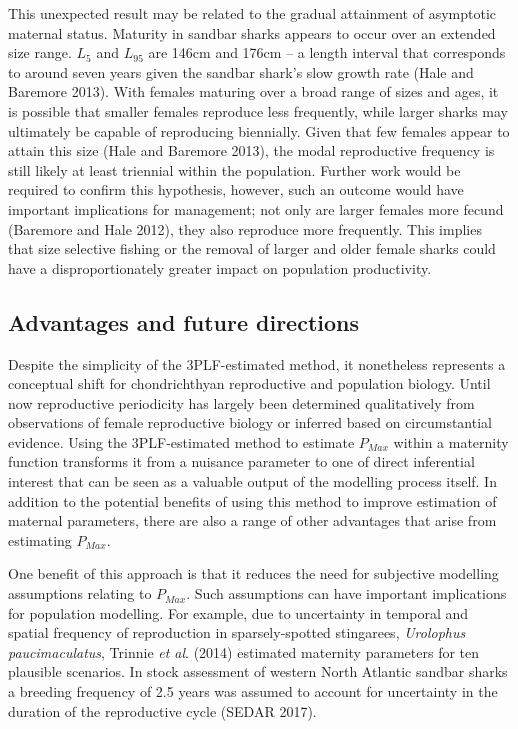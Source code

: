 \documentclass[
]{article}
\begin{document}
This unexpected result may be related to the gradual attainment of asymptotic maternal status. Maturity in sandbar sharks appears to occur over an extended size range. \(L_{5}\) and \(L_{95}\) are 146cm and 176cm -- a length interval that corresponds to around seven years given the sandbar shark's slow growth rate (Hale and Baremore 2013). With females maturing over a broad range of sizes and ages, it is possible that smaller females reproduce less frequently, while larger sharks may ultimately be capable of reproducing biennially. Given that few females appear to attain this size (Hale and Baremore 2013), the modal reproductive frequency is still likely at least triennial within the population. Further work would be required to confirm this hypothesis, however, such an outcome would have important implications for management; not only are larger females more fecund (Baremore and Hale 2012), they also reproduce more frequently. This implies that size selective fishing or the removal of larger and older female sharks could have a disproportionately greater impact on population productivity.

\subsection{Advantages and future directions}\label{advantages-and-future-directions}

Despite the simplicity of the 3PLF-estimated method, it nonetheless represents a conceptual shift for chondrichthyan reproductive and population biology. Until now reproductive periodicity has largely been determined qualitatively from observations of female reproductive biology or inferred based on circumstantial evidence. Using the 3PLF-estimated method to estimate \(P_{Max}\) within a maternity function transforms it from a nuisance parameter to one of direct inferential interest that can be seen as a valuable output of the modelling process itself. In addition to the potential benefits of using this method to improve estimation of maternal parameters, there are also a range of other advantages that arise from estimating \(P_{Max}\).

One benefit of this approach is that it reduces the need for subjective modelling assumptions relating to \(P_{Max}\). Such assumptions can have important implications for population modelling. For example, due to uncertainty in temporal and spatial frequency of reproduction in sparsely-spotted stingarees, \emph{Urolophus paucimaculatus}, Trinnie \emph{et al}. (2014) estimated maternity parameters for ten plausible scenarios. In stock assessment of western North Atlantic sandbar sharks a breeding frequency of 2.5 years was assumed to account for uncertainty in the duration of the reproductive cycle (SEDAR 2017).
\end{document}

